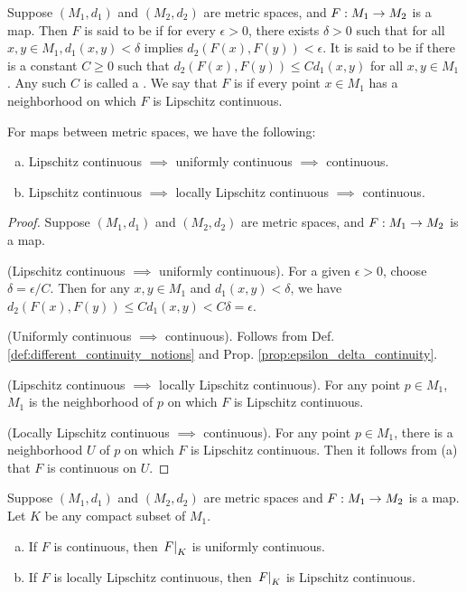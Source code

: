\documentclass[11pt,a4paper]{article}
\begin{document}
\begin{mydef}\label{def:different_continuity_notions}
Suppose $(M_1,d_1)$ and $(M_2,d_2)$ are metric spaces, and $F:M_1\rightarrow M_2$ is a map. Then $F$ is said to be  if for every $\epsilon>0$, there exists $\delta>0$ such that for all $x,y\in M_1,d_1(x,y)<\delta$ implies $d_2(F(x),F(y))<\epsilon$. It is said to be  if there is a constant $C\ge 0$ such that $d_2(F(x),F(y))\le Cd_1(x,y)$ for all $x,y\in M_1$. Any such $C$ is called a . We say that $F$ is  if every point $x\in M_1$ has a neighborhood on which $F$ is Lipschitz continuous.
\end{mydef}

\begin{prop}
For maps between metric spaces, we have the following:
\begin{enumerate}[(a)]
    \item Lipschitz continuous $\implies$ uniformly continuous $\implies$ continuous.
    \item Lipschitz continuous $\implies$ locally Lipschitz continuous $\implies$ continuous.
\end{enumerate}
\end{prop}

\begin{proof}
Suppose $(M_1,d_1)$ and $(M_2,d_2)$ are metric spaces, and $F:M_1\rightarrow M_2$ is a map.

 (Lipschitz continuous $\implies$ uniformly continuous). For a given $\epsilon>0$, choose $\delta = \epsilon/C$. Then for any $x,y\in M_1$ and $d_1(x,y)<\delta$, we have $d_2(F(x),F(y))\le Cd_1(x,y)<C\delta = \epsilon$. 

(Uniformly continuous $\implies$ continuous). Follows from Def. \ref{def:different_continuity_notions} and Prop. \ref{prop:epsilon_delta_continuity}.

 (Lipschitz continuous $\implies$ locally Lipschitz continuous). For any point $p\in M_1$, $M_1$ is the neighborhood of $p$ on which $F$ is Lipschitz continuous.

(Locally Lipschitz continuous $\implies$ continuous). For any point $p\in M_1$, there is a neighborhood $U$ of $p$ on which $F$ is Lipschitz continuous. Then it follows from (a) that $F$ is continuous on $U$.
\end{proof}

\begin{prop}
Suppose $(M_1,d_1)$ and $(M_2,d_2)$ are metric spaces and $F:M_1\rightarrow M_2$ is a map. Let $K$ be any compact subset of $M_1$.
\begin{enumerate}[(a)]
    \item If $F$ is continuous, then $\left.F\right|_{K}$ is uniformly continuous.
    \item If $F$ is locally Lipschitz continuous, then $\left.F\right|_{K}$ is  Lipschitz continuous.
\end{enumerate}
\end{prop}
\end{document}
